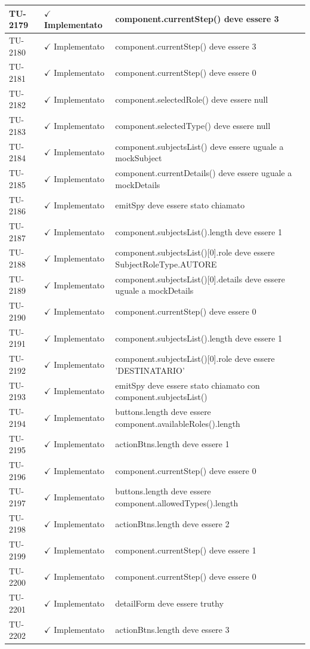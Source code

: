 ﻿\documentclass[a4paper,12pt]{article}
\newcommand{\ok}{\textcolor{green!60!black}{$\checkmark$ Implementato}}
\begin{document}
\begin{longtable}{|p{2cm}|p{3.5cm}|p{9.5cm}|}
\hline
TU-2179 & \ok & component.currentStep() deve essere 3 \\
\hline
TU-2180 & \ok & component.currentStep() deve essere 3 \\
\hline
TU-2181 & \ok & component.currentStep() deve essere 0 \\
\hline
TU-2182 & \ok & component.selectedRole() deve essere null \\
\hline
TU-2183 & \ok & component.selectedType() deve essere null \\
\hline
TU-2184 & \ok & component.subjectsList() deve essere uguale a mockSubject \\
\hline
TU-2185 & \ok & component.currentDetails() deve essere uguale a mockDetails \\
\hline
TU-2186 & \ok & emitSpy deve essere stato chiamato \\
\hline
TU-2187 & \ok & component.subjectsList().length deve essere 1 \\
\hline
TU-2188 & \ok & component.subjectsList()[0].role deve essere SubjectRoleType.AUTORE \\
\hline
TU-2189 & \ok & component.subjectsList()[0].details deve essere uguale a mockDetails \\
\hline
TU-2190 & \ok & component.currentStep() deve essere 0 \\
\hline
TU-2191 & \ok & component.subjectsList().length deve essere 1 \\
\hline
TU-2192 & \ok & component.subjectsList()[0].role deve essere 'DESTINATARIO' \\
\hline
TU-2193 & \ok & emitSpy deve essere stato chiamato con component.subjectsList() \\
\hline
TU-2194 & \ok & buttons.length deve essere component.availableRoles().length \\
\hline
TU-2195 & \ok & actionBtns.length deve essere 1 \\
\hline
TU-2196 & \ok & component.currentStep() deve essere 0 \\
\hline
TU-2197 & \ok & buttons.length deve essere component.allowedTypes().length \\
\hline
TU-2198 & \ok & actionBtns.length deve essere 2 \\
\hline
TU-2199 & \ok & component.currentStep() deve essere 1 \\
\hline
TU-2200 & \ok & component.currentStep() deve essere 0 \\
\hline
TU-2201 & \ok & detailForm deve essere truthy \\
\hline
TU-2202 & \ok & actionBtns.length deve essere 3 \\

\end{longtable}
\end{document}
